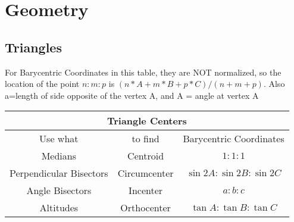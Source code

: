 \section{Geometry}






%  

\subsection{Triangles}

For Barycentric Coordinates in this table, they are NOT normalized, so the location of the point $n : m : p$ is $(n*A+m*B+p*C)/(n+m+p)$. Also a=length of side opposite of the vertex A, and A = angle at vertex A


\begin{tabular}{|c|c|c|}
\hline 
\multicolumn{3}{|c|}{Triangle Centers}\\\hline
Use what & to find & Barycentric Coordinates \\ \hline\hline
Medians & Centroid & $1:1:1$\\\hline
Perpendicular Bisectors & Circumcenter & $ \sin 2A : \sin 2B : \sin 2C $\\\hline
Angle Bisectors & Incenter& $a : b : c$\\\hline
Altitudes & Orthocenter & $\tan A : \tan B : \tan C$\\\hline
\end{tabular}



